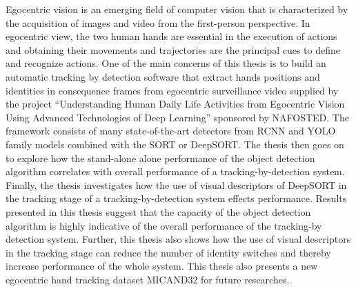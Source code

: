 % 
% 
%
Egocentric vision is an emerging field of computer vision that is characterized by the acquisition of images and video from the first-person perspective. In egocentric view, the two human hands are essential in the execution of actions and obtaining their movements and trajectories are the principal cues to define and recognize actions.
One of the main concerns of this thesis is to build an automatic tracking by detection software that extract hands positions and identities in consequence frames from egocentric surveillance video supplied by the project “Understanding Human Daily Life Activities from Egocentric Vision Using Advanced Technologies of Deep Learning” sponsored by NAFOSTED. The framework consists of many state-of-the-art detectors from RCNN and YOLO family models combined with the SORT or DeepSORT. The thesis then goes on to explore how the stand-alone alone performance of the object detection algorithm correlates with overall performance of a tracking-by-detection system. Finally, the thesis investigates how the use of visual descriptors of DeepSORT in the tracking stage of a tracking-by-detection system effects performance.
Results presented in this thesis suggest that the capacity of the object detection algorithm is highly indicative of the overall performance of the tracking-by detection system. Further, this thesis also shows how the use of visual descriptors in the tracking stage can reduce the number of identity switches and thereby increase performance of the whole system. This thesis also presents a new egocentric hand tracking dataset MICAND32 for future researches.

